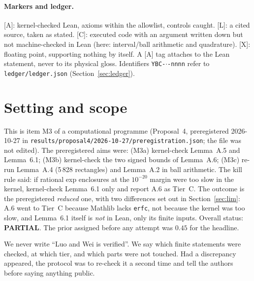 \documentclass[11pt]{article}
\newcommand{\tier}[1]{\textsf{[#1]}}
\newcommand{\tA}{\tier{A}}
\newcommand{\tL}{\tier{L}}
\newcommand{\tC}{\tier{C}}
\newcommand{\tX}{\tier{X}}
\newcommand{\lean}[1]{\texttt{#1}}
\begin{document}
\begin{abstract}
\medskip
\noindent{}
\end{abstract}

\paragraph{Markers and ledger.} \tA{}: kernel-checked Lean, axioms within the allowlist, controls caught. \tL{}: a cited source, taken as stated.
\tC{}: executed code with an argument written down but not machine-checked in Lean (here: interval/ball arithmetic and quadrature). \tX{}: floating
point, supporting nothing by itself. A \tA{} tag attaches to the Lean statement, never to its physical gloss.
Identifiers \texttt{YBC-$\cdot$-nnnn} refer to \texttt{ledger/ledger.json} (Section~\ref{sec:ledger}).

\section{Setting and scope}\label{sec:setting}
This is item M3 of a computational programme (Proposal~4, preregistered 2026-10-27 in \texttt{results/proposal4/2026-10-27/preregistration.json};
the file was not edited). The preregistered aims were: (M3a) kernel-check Lemma~A.5 and Lemma~6.1; (M3b) kernel-check the two signed bounds of Lemma~A.6;
(M3c) re-run Lemma~A.4 (5\,828 rectangles) and Lemma~A.2 in ball arithmetic. The kill rule said: if rational exp enclosures at the $10^{-20}$ margin were too
slow in the kernel, kernel-check Lemma~6.1 only and report A.6 as Tier~C. The outcome is the preregistered \emph{reduced} one, with two differences set out in
Section~\ref{sec:lim}: A.6 went to Tier~C because Mathlib lacks \lean{erfc}, not because the kernel was too slow, and Lemma~6.1 itself is \emph{not} in Lean, only its finite inputs.
Overall status: \textbf{PARTIAL}. The prior assigned before any attempt was $0.45$ for the headline.

We never write ``Luo and Wei is verified''. We say which finite statements were checked, at which tier, and which parts were not touched.
Had a discrepancy appeared, the protocol was to re-check it a second time and tell the authors before saying anything public.
\end{document}
